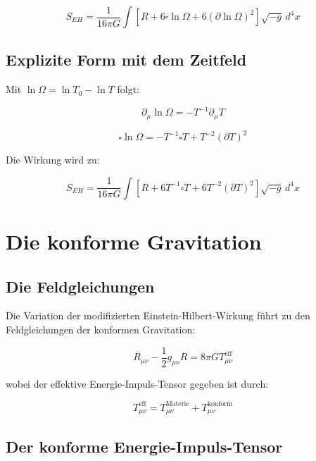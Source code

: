 \documentclass[12pt,a4paper]{report}
\begin{document}
	\begin{equation}
		S_{EH} = \frac{1}{16\pi G} \int [R + 6\square\ln \Omega + 6(\partial\ln \Omega)^2] \sqrt{-g} \, d^4x
	\end{equation}
	
	\subsection{Explizite Form mit dem Zeitfeld}
	
	Mit $\ln \Omega = \ln T_0 - \ln T$ folgt:
	
	\begin{equation}
		\partial_\mu \ln \Omega = -T^{-1}\partial_\mu T
	\end{equation}
	
	\begin{equation}
		\square\ln \Omega = -T^{-1}\square T + T^{-2}(\partial T)^2
	\end{equation}
	
	Die Wirkung wird zu:
	
	\begin{equation}
		S_{EH} = \frac{1}{16\pi G} \int [R + 6T^{-1}\square T + 6T^{-2}(\partial T)^2] \sqrt{-g} \, d^4x
	\end{equation}
	
	\section{Die konforme Gravitation}
	
	\subsection{Die Feldgleichungen}
	
	Die Variation der modifizierten Einstein-Hilbert-Wirkung führt zu den Feldgleichungen der konformen Gravitation:
	
	\begin{equation}
		R_{\mu\nu} - \frac{1}{2}g_{\mu\nu}R = 8\pi G T_{\mu\nu}^{\text{eff}}
	\end{equation}
	
	wobei der effektive Energie-Impuls-Tensor gegeben ist durch:
	
	\begin{equation}
		T_{\mu\nu}^{\text{eff}} = T_{\mu\nu}^{\text{Materie}} + T_{\mu\nu}^{\text{konform}}
	\end{equation}
	
	\subsection{Der konforme Energie-Impuls-Tensor}
	
\end{document}
